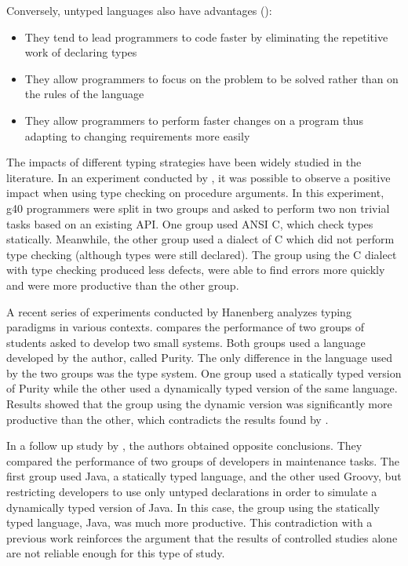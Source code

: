 \documentclass[msc]{ppgccufmg}
\begin{document}
Conversely, untyped languages also have advantages (\cite{types_and_programming_languages, dynamically_typed_languages}):
\begin{itemize}
	\item They tend to lead programmers to code faster by eliminating the repetitive work of declaring types
	\item They allow programmers to focus on the problem to be solved rather than on the rules of the language 
	\item They allow programmers to perform faster changes on a program thus adapting to changing requirements more easily
\end{itemize}

The impacts of different typing strategies have been widely studied in the literature.
In an experiment conducted by \cite{Prechelt98}, it was possible to observe a positive impact when using type checking on procedure arguments.
In this experiment, g40 programmers were split in two groups and asked to perform two non trivial tasks based on an existing API.
One group used ANSI C, which check types statically.
Meanwhile, the other group used a dialect of C which did not perform type checking (although types were still declared).
The group using the C dialect with type checking produced less defects, were able to find errors more quickly and were more productive than the other group.

A recent series of experiments conducted by Hanenberg analyzes typing paradigms in various contexts.
\cite{experiment_with_purity} compares the performance of two groups of students asked to develop two small systems. 
Both groups used a language developed by the author, called Purity. 
The only difference in the language used by the two groups was the type system.
One group used a statically typed version of Purity while the other used a dynamically typed version of the same language.
Results showed that the group using the dynamic version was significantly more productive than the other, which contradicts the results found by \cite{Prechelt98}. 

In a follow up study by \cite{hanenberg_icpc}, the authors obtained opposite conclusions. 
They compared the performance of two groups of developers in maintenance tasks. 
The first group used Java, a statically typed language, and the other used Groovy, but restricting developers to use only untyped declarations in order to simulate a dynamically typed version of Java.
In this case, the group using the statically typed language, Java, was much more productive.
This contradiction with a previous work reinforces the argument that the results of controlled studies alone are not reliable enough for this type of study.
\end{document}
